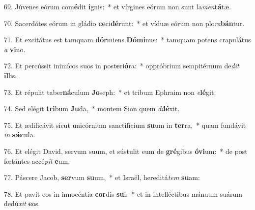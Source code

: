 69. Júvenes eórum com\textbf{é}dit \textbf{i}gnis:~*  et vírgines eórum non sunt la\textit{men}\textbf{tá}tæ.\

70. Sacerdótes eórum in gládio \textbf{ce}ci\textbf{dé}runt:~*  et víduæ eórum non plo\textit{ra}\textbf{bán}tur.\

71. Et excitátus est tamquam \textbf{dór}miens \textbf{Dó}\textbf{mi}nus:~*  tamquam potens crapulátus \textit{a} \textbf{vi}no.\

72. Et percússit inimícos suos in post\textbf{e}ri\textbf{ó}ra:~*  oppróbrium sempitérnum de\textit{dit} \textbf{il}lis.\

73. Et répulit taber\textbf{ná}culum \textbf{Jo}seph:~*  et tribum Ephraim non \textit{e}\textbf{lé}git.\

74. Sed elégit \textbf{tri}bum \textbf{Ju}da,~*  montem Sion quem \textit{di}\textbf{lé}xit.\

75. Et ædificávit sicut unicórnium sanctifícium \textbf{su}um in \textbf{ter}ra,~*  quam fundávit \textit{in} \textbf{sǽ}cula.\

76. Et elégit David, servum suum, et sústulit eum de \textbf{gré}gibus \textbf{ó}\textbf{vi}um:~*  de post fœtántes accé\textit{pit} \textbf{e}um,\

77. Páscere Jacob, \textbf{ser}vum \textbf{su}um,~*  et Israël, hereditá\textit{tem} \textbf{su}am:\

78. Et pavit eos in innocéntia \textbf{cor}dis \textbf{su}i:~*  et in intelléctibus mánuum suárum dedú\textit{xit} \textbf{e}os.\

